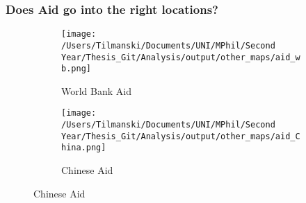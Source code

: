 \documentclass[]{beamer}   	%
\begin{document}
\begin{frame}
\begin{table}[!t]
{}

\end{table}

\end{frame}


\begin{frame}
\frametitle{Does Aid go into the right locations?}
\begin{figure}[t]
\centering
\caption{Spatial Distribution of Development Aid Projects}

\begin{subfigure}[c]{0.48\textwidth}
\texttt{[image: /Users/Tilmanski/Documents/UNI/MPhil/Second Year/Thesis\_Git/Analysis/output/other\_maps/aid\_wb.png]}
\caption{World Bank Aid}
\label{fig:WB_aid_map}
\end{subfigure}
\begin{subfigure}[c]{0.48\textwidth}
\texttt{[image: /Users/Tilmanski/Documents/UNI/MPhil/Second Year/Thesis\_Git/Analysis/output/other\_maps/aid\_China.png]}
\caption{Chinese Aid}
\label{fig:China_aid_map}
\end{subfigure}

\label{fig:Aid_maps}
\end{figure}
\end{frame}
\end{document}
